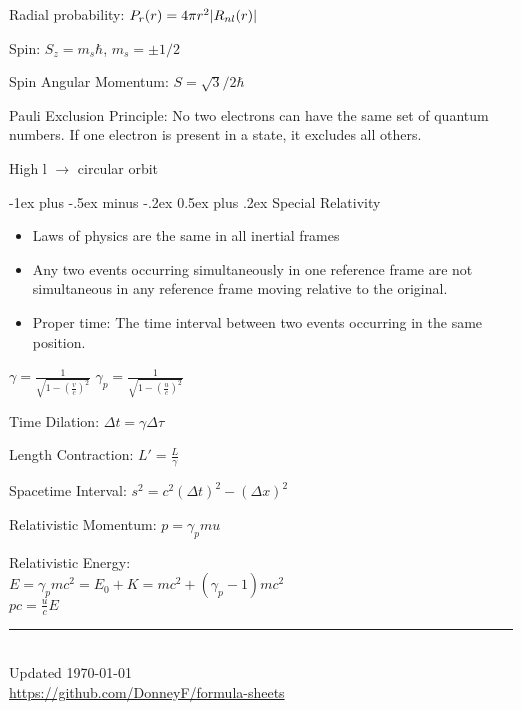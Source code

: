 \documentclass[12pt,landscape]{article}
\makeatletter
\renewcommand{\section}{\@startsection{section}{1}{0mm}%
	{-1ex plus -.5ex minus -.2ex}%
	{0.5ex plus .2ex}%
	{\normalfont\large\bfseries}}
\newcommand{\tab}{\hspace{.02\textwidth}}
\newcommand{\ds}{\displaystyle}
\makeatother
\begin{document}
\begin{multicols}{3}
	Radial probability: \tab $P_r(r) = 4\pi r^2 \abs{R_{nl}(r)}$
	
	Spin: \tab $S_z = m_s \hbar$, $m_s = \pm 1/2$
	
	Spin Angular Momentum: \tab $S=\sqrt{3}/2\hbar$
	
	Pauli Exclusion Principle: No two electrons can have the same set of quantum numbers. If one electron is present in a state, it excludes all others.
	
	High l $\rightarrow$ circular orbit
	
	\section{Special Relativity}
	\begin{itemize}[leftmargin=0.5cm]
		\itemsep0em
		\item Laws of physics are the same in all inertial frames
		\item Any two events occurring simultaneously in one reference frame are not simultaneous in any reference frame moving relative to the original.
		\item Proper time: The time interval between two events occurring in the same position.
	\end{itemize}
	\tab $\ds \gamma = \frac{1}{\sqrt{1-(\frac{v}{c})^2}}$ \hspace{0.5cm} $\ds \gamma_p = \frac{1}{\sqrt{1-(\frac{u}{c})^2}}$
	
	Time Dilation:
	\tab $\Delta t = \gamma \Delta \tau$
	
	Length Contraction:
	\tab $L' = \frac{L}{\gamma}$
	
	Spacetime Interval:
	\tab $s^2 = c^2(\Delta t)^2 - (\Delta x)^2$
	
	Relativistic Momentum:
	\tab $p = \gamma_p m u$
	
	Relativistic Energy:\\
	\tab $E = \gamma_p mc^2 = E_0 + K = mc^2 + (\gamma_p - 1)mc^2$\\
	\tab $pc = \frac{u}{c}E$
	
	\rule{0.3\linewidth}{0.25pt}
	\scriptsize\\
	Updated \today\\
	\href{https://github.com/DonneyF/formula-sheets}{https://github.com/DonneyF/formula-sheets}
\end{multicols}
\end{document}
